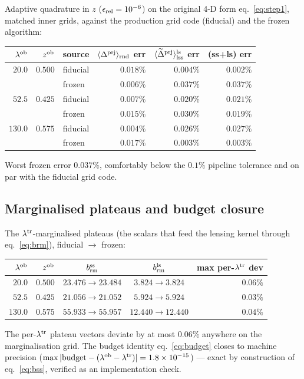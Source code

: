 \documentclass[a4paper, 11pt]{article}
\newcommand{\lob}{\lambda^{\rm ob}}
\newcommand{\ltr}{\lambda^{\rm tr}}
\newcommand{\zob}{z^{\rm ob}}
\newcommand{\dprj}{\Delta^{\rm prj}}
\newcommand{\brmss}{b_{\rm rm}^{\rm ss}}
\newcommand{\brmls}{b_{\rm rm}^{\rm ls}}
\newcommand{\Dprnd}{\langle \dprj\rangle_{\rm rnd}}
\newcommand{\tDpls}{\langle \widetilde{\Delta}^{\rm prj}\rangle^{\rm ls}_{\rm lss}}
\begin{document}
Adaptive quadrature in $z$ ($\epsilon_{\rm rel}=10^{-6}$) on the
original 4-D form eq.~\eqref{eq:step1}, matched inner grids,
against the production grid code (fiducial) and the frozen
algorithm:
\begin{center}
\small
\begin{tabular}{r r l r r r}
\toprule
$\lob$ & $\zob$ & source & $\Dprnd$ err & $\tDpls$ err
& (ss+ls) err \\
\midrule
$20.0$  & $0.500$ & fiducial & $0.018\%$ & $0.004\%$ & $0.002\%$ \\
        &         & frozen   & $0.006\%$ & $0.037\%$ & $0.037\%$ \\
$52.5$  & $0.425$ & fiducial & $0.007\%$ & $0.020\%$ & $0.021\%$ \\
        &         & frozen   & $0.015\%$ & $0.030\%$ & $0.019\%$ \\
$130.0$ & $0.575$ & fiducial & $0.004\%$ & $0.026\%$ & $0.027\%$ \\
        &         & frozen   & $0.017\%$ & $0.003\%$ & $0.003\%$ \\
\bottomrule
\end{tabular}
\end{center}
Worst frozen error $0.037\%$, comfortably below the $0.1\%$
pipeline tolerance and on par with the fiducial grid code.

\subsection{Marginalised plateaus and budget closure}

The $\ltr$-marginalised plateaus (the scalars that feed the
lensing kernel through eq.~\ref{eq:brm}), fiducial
$\rightarrow$ frozen:
\begin{center}
\small
\begin{tabular}{r r c c r}
\toprule
$\lob$ & $\zob$ & $\brmss$ & $\brmls$
& max per-$\ltr$ dev \\
\midrule
$20.0$  & $0.500$ & $23.476 \rightarrow 23.484$
& $3.824 \rightarrow 3.824$ & $0.06\%$ \\
$52.5$  & $0.425$ & $21.056 \rightarrow 21.052$
& $5.924 \rightarrow 5.924$ & $0.03\%$ \\
$130.0$ & $0.575$ & $55.933 \rightarrow 55.957$
& $12.440 \rightarrow 12.440$ & $0.04\%$ \\
\bottomrule
\end{tabular}
\end{center}
The per-$\ltr$ plateau vectors deviate by at most $0.06\%$
anywhere on the marginalisation grid. The budget identity
eq.~\eqref{eq:budget} closes to machine precision
($\max|{\rm budget}-(\lob-\ltr)| = 1.8\times10^{-15}$) --- exact
by construction of eq.~\eqref{eq:bss}, verified as an
implementation check.
\end{document}
